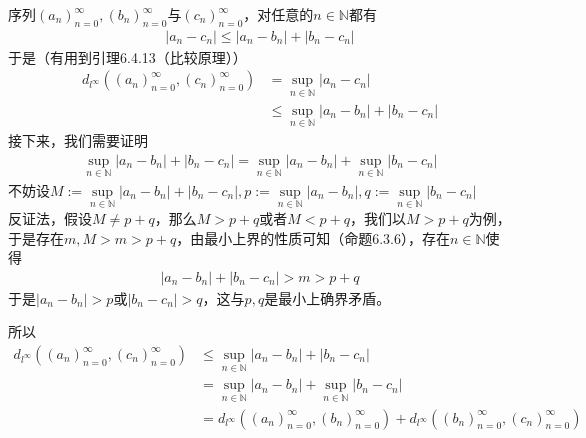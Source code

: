 \documentclass{article}
\begin{document}
\begin{itemize}
            序列$(a_n)_{n=0}^\infty,(b_n)_{n=0}^\infty$与$(c_n)_{n=0}^\infty$，对任意的$n \in \mathbb{N}$都有
            \begin{align*}
                  |a_n - c_n| \leq |a_n - b_n| + |b_n - c_n|
            \end{align*}
            于是（有用到引理6.4.13（比较原理））
            \begin{align*}
                  d_{l^\infty}((a_n)_{n = 0}^\infty, (c_n)_{n = 0}^\infty) & = \sup \limits_{n \in \mathbb{N}} |a_n - c_n|                  \\
                                                                           & \leq \sup \limits_{n \in \mathbb{N}} |a_n - b_n| + |b_n - c_n|
            \end{align*}
            接下来，我们需要证明
            \begin{align*}
                  \sup \limits_{n \in \mathbb{N}} |a_n - b_n| + |b_n - c_n| = \sup \limits_{n \in \mathbb{N}} |a_n - b_n| + \sup \limits_{n \in \mathbb{N}} |b_n - c_n|
            \end{align*}
            不妨设$M := \sup \limits_{n \in \mathbb{N}} |a_n - b_n| + |b_n - c_n|, p := \sup \limits_{n \in \mathbb{N}} |a_n - b_n|, q := \sup \limits_{n \in \mathbb{N}} |b_n - c_n|$\\
            反证法，假设$M \neq p + q$，那么$M > p + q$或者$M < p + q$，我们以$M > p + q$为例，
            于是存在$m, M > m > p + q$，由最小上界的性质可知（命题6.3.6），存在$n \in \mathbb{N}$使得
            \begin{align*}
                  |a_n - b_n| + |b_n - c_n| > m > p + q
            \end{align*}
            于是$|a_n - b_n| > p$或$|b_n - c_n| > q$，这与$p,q$是最小上确界矛盾。

            所以
            \begin{align*}
                  d_{l^\infty}((a_n)_{n = 0}^\infty, (c_n)_{n = 0}^\infty) & \leq \sup \limits_{n \in \mathbb{N}} |a_n - b_n| + |b_n - c_n|                                                        \\
                                                                           & = \sup \limits_{n \in \mathbb{N}} |a_n - b_n| + \sup \limits_{n \in \mathbb{N}} |b_n - c_n|                           \\
                                                                           & = d_{l^\infty}((a_n)_{n = 0}^\infty, (b_n)_{n = 0}^\infty) + d_{l^\infty}((b_n)_{n = 0}^\infty, (c_n)_{n = 0}^\infty)
            \end{align*}
\end{itemize}
\end{document}
